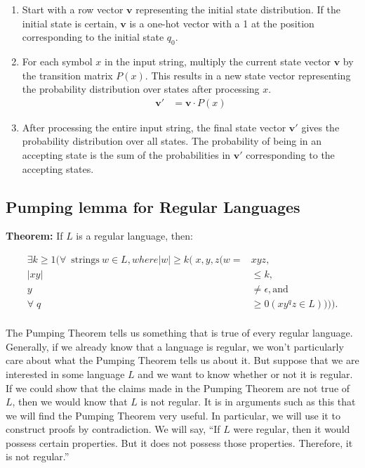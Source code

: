 \documentclass[hidelinks,12pt]{article}
\begin{document}
\begin{enumerate}
    \item Start with a row vector $\mathbf{v}$ representing the initial state distribution. If the initial state is certain, $\mathbf{v}$ is a one-hot vector with a 1 at the position corresponding to the initial state $q_0$.
    \item For each symbol $x$ in the input string, multiply the current state vector $\mathbf{v}$ by the transition matrix $P(x)$. This results in a new state vector representing the probability distribution over states after processing $x$.
        \begin{align*}
            \mathbf{v}' &= \mathbf{v} \cdot P(x)
        \end{align*}
    \item After processing the entire input string, the final state vector $\mathbf{v}'$ gives the probability distribution over all states. The probability of being in an accepting state is the sum of the probabilities in $\mathbf{v}'$ corresponding to the accepting states.
\end{enumerate}

\subsection{Pumping lemma for Regular Languages }

\textbf{Theorem:} If $L$ is a regular language, then: 

\begin{align*}
    \exists k \ge 1 ( \forall \>\text{strings} \> w \in L, where |w| \ge k (x, y, z (w = &xyz, \\
    |xy| &\le k, \\
    y &\ne \epsilon, \text{and} \\
    \forallq &\ge 0 (xy^{q}z \in L)))). \\
\end{align*}
 
The Pumping Theorem tells us something that is true of every regular language.
Generally, if we already know that a language is regular, we won’t particularly
care about what the Pumping Theorem tells us about it. But suppose that we are
interested in some language $L$ and we want to know whether or not it is
regular. If we could show that the claims made in the Pumping Theorem are not
true of $L$, then we would know that $L$ is not regular. It is in arguments
such as this that we will find the Pumping Theorem very useful. In particular,
we will use it to construct proofs by contradiction. We will say, “If $L$ were
regular, then it would possess certain properties. But it does not possess
those properties. Therefore, it is not regular.”
\end{document}
